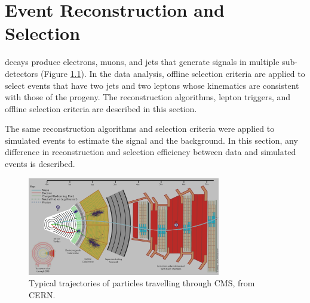 \chapter{Event Reconstruction and Selection}
\label{sec:reco_chapter}

\WR decays produce electrons, muons, and jets that generate signals in multiple sub-detectors (Figure 
\ref{fig:particleTrajectories}).  In the data analysis, offline selection criteria are applied to select events that have two jets 
and two leptons whose kinematics are consistent with those of the \WR progeny.  The reconstruction algorithms, lepton triggers, and 
offline selection criteria are described in this section.

The same reconstruction algorithms and selection criteria were applied to simulated events to estimate the signal and the background.  
In this section, any difference in reconstruction and selection efficiency between data and simulated events is described.

\begin{figure}[h]
	\centering
	\includegraphics[width=0.75\textwidth]{figures/flowOfParticlesThroughCMS.png}
	\caption{Typical trajectories of particles travelling through CMS, from CERN.}
	\label{fig:particleTrajectories}
\end{figure}


